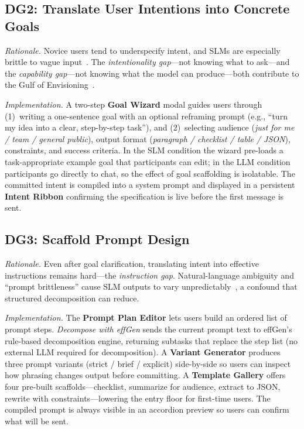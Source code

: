 \subsection{DG2: Translate User Intentions into Concrete Goals}

\textit{Rationale.}
Novice users tend to underspecify intent, and SLMs are especially brittle to
vague input~\cite{zamfirescu2023johnny}.
The \textit{intentionality gap}---not knowing what to ask---and the
\textit{capability gap}---not knowing what the model can produce---both
contribute to the Gulf of Envisioning~\cite{subramonyam2024gulf}.

\textit{Implementation.}
A two-step \textbf{Goal Wizard} modal guides users through (1)~writing a
one-sentence goal with an optional reframing prompt (e.g., ``turn my idea into
a clear, step-by-step task''), and (2)~selecting audience (\textit{just for me
/ team / general public}), output format (\textit{paragraph / checklist / table
/ JSON}), constraints, and success criteria.
In the SLM condition the wizard pre-loads a task-appropriate example goal that
participants can edit; in the LLM condition participants go directly to chat, so
the effect of goal scaffolding is isolatable.
The committed intent is compiled into a system prompt and displayed in a
persistent \textbf{Intent Ribbon} confirming the specification is live before
the first message is sent.

\subsection{DG3: Scaffold Prompt Design}

\textit{Rationale.}
Even after goal clarification, translating intent into effective instructions
remains hard---the \textit{instruction gap}.
Natural-language ambiguity and ``prompt brittleness'' cause SLM outputs to
vary unpredictably~\cite{zamfirescu2023johnny}, a confound that structured
decomposition can reduce.

\textit{Implementation.}
The \textbf{Prompt Plan Editor} lets users build an ordered list of prompt
steps.
\textit{Decompose with effGen} sends the current prompt text to effGen's
rule-based decomposition engine, returning subtasks that replace the step list
(no external LLM required for decomposition).
A \textbf{Variant Generator} produces three prompt variants (strict /
brief / explicit) side-by-side so users can inspect how phrasing changes
output before committing.
A \textbf{Template Gallery} offers four pre-built scaffolds---checklist,
summarize for audience, extract to JSON, rewrite with constraints---lowering
the entry floor for first-time users.
The compiled prompt is always visible in an accordion preview so users can
confirm what will be sent.

